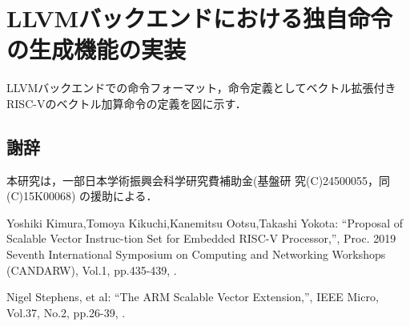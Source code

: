 \documentclass[a4paper,9pt, twocolumn]{jarticle}
\renewcommand{\baselinestretch}{0.87}   %
\begin{document}
\section{LLVMバックエンドにおける独自命令の生成機能の実装}

LLVMバックエンドでの命令フォーマット，命令定義としてベクトル拡張付きRISC-Vのベクトル加算命令の定義を図に示す．

\renewcommand{\baselinestretch}{0.83}\selectfont
\subsection*{\small 謝辞}
\vspace{-0.5mm}
{\small 本研究は，一部日本学術振興会科学研究費補助金(基盤研
究(C)24500055，同(C)15K00068) の援助による．}


%
%
\begin{thebibliography}{9}
\itemsep -1.7pt

{\small Yoshiki Kimura,Tomoya Kikuchi,Kanemitsu Ootsu,Takashi Yokota:      %
\newblock ``Proposal of Scalable Vector Instruc-tion Set for Embedded RISC-V Processor,'',
\newblock Proc. 2019 Seventh International Symposium on Computing and Networking Workshops (CANDARW),
\newblock Vol.1,
\newblock pp.435-439,
.}

{\small Nigel Stephens, et al:      %
\newblock ``The ARM Scalable Vector Extension,'',
\newblock IEEE Micro,
\newblock Vol.37,
\newblock No.2,
\newblock pp.26-39,
.}

\end{thebibliography}
\end{document}
